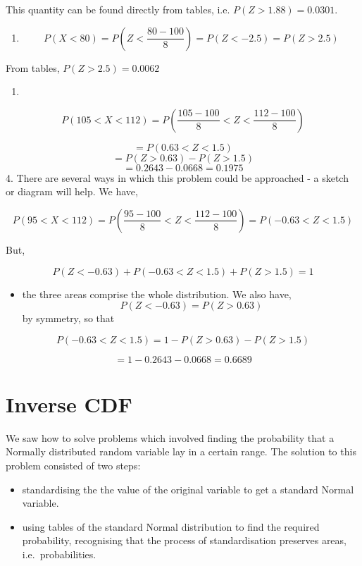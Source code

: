 \documentclass[
]{book}
\providecommand{\tightlist}{%
  \setlength{\itemsep}{0pt}\setlength{\parskip}{0pt}}
\theoremstyle{definition}
\theoremstyle{definition}
\theoremstyle{definition}
\theoremstyle{definition}
\theoremstyle{remark}
\begin{document}
This quantity can be found directly from tables, i.e.
\(P(Z>1.88)=0.0301\).

\begin{enumerate}
\def\labelenumi{\arabic{enumi}.}
\setcounter{enumi}{1}
\tightlist
\item
  \[P(X<80)  =  P\left(Z<\frac{80-100}{8}\right)
          =  P(Z<-2.5)
          =  P(Z>2.5)\]
\end{enumerate}

From tables, \(P(Z>2.5)=0.0062\)

\begin{enumerate}
\def\labelenumi{\arabic{enumi}.}
\setcounter{enumi}{2}
\item
\end{enumerate}

\[P(105<X<112)  =  P\left(\frac{105-100}{8}<Z<\frac{112-100}{8}\right)\]

\[= P(0.63<Z<1.5)\]
\[=P(Z>0.63)-P(Z>1.5)\]
\[= 0.2643-0.0668=0.1975\]
4.
There are several ways in which this problem could be approached - a sketch or diagram will help. We have,

\[P(95<X<112) =  P\left(\frac{95-100}{8}<Z<\frac{112-100}{8}\right)
          =  P(-0.63<Z<1.5)\]

But,

\[P(Z<-0.63)+P(-0.63<Z<1.5)+P(Z>1.5)=1\]

\begin{itemize}
\tightlist
\item
  the three areas comprise the whole distribution. We also have,
  \[P(Z<-0.63)=P(Z>0.63)\]
  by symmetry, so that
\end{itemize}

\[P(-0.63<Z<1.5) =  1-P(Z>0.63)-P(Z>1.5)\]

\[=  1-0.2643-0.0668=0.6689\]

\hypertarget{inverse-cdf}{%
\section{Inverse CDF}\label{inverse-cdf}}

We saw how to solve problems which involved finding the probability that a Normally distributed
random variable lay in a certain range. The solution to this problem consisted of two steps:

\begin{itemize}
\tightlist
\item
  standardising the the value of the original variable to get a standard Normal variable.
\item
  using tables of the standard Normal distribution to find the required probability, recognising that the process of
  standardisation preserves areas, i.e.~probabilities.
\end{itemize}
\end{document}
